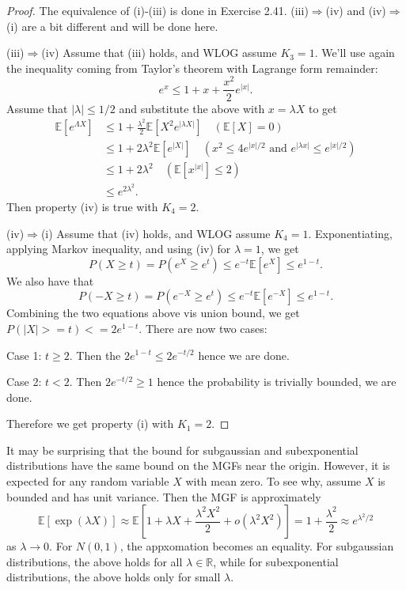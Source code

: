 \begin{proof}
The equivalence of (i)-(iii) is done in Exercise 2.41. (iii)$\Rightarrow$(iv) and (iv)$\Rightarrow$(i) 
are a bit different and will be done here.

(iii)$\Rightarrow$(iv) Assume that (iii) holds, and WLOG assume $K_3 = 1$. We'll use again the 
inequality coming from Taylor's theorem with Lagrange form remainder: 
\[ e^x \leq 1 + x + \frac{x^2}{2}e^{|x|}. \]
Assume that $|\lambda| \leq 1/2$ and substitute the above with $x = \lambda X$ to get 
\begin{align*}
	\mathbb{E}[e^{\Lambda X}] 
	&\leq 1 + \frac{\lambda^2}{2}\mathbb{E}[X^2 e^{|\lambda X|}] \quad (\mathbb{E}[X] = 0) \\
	&\leq 1 + 2 \lambda^2 \mathbb{E}[e^{|X|}] \quad (x^2 \leq 4e^{|x| / 2} \text{ and } 
	e^{|\lambda x|} \leq e^{|x| / 2}) \\
	&\leq 1 + 2 \lambda^2 \quad (\mathbb{E}[x^{|x|}] \leq 2) \\
	&\leq e^{2 \lambda^2}.
\end{align*}
Then property (iv) is true with $K_4 = 2$.

(iv)$\Rightarrow$(i) Assume that (iv) holds, and WLOG assume $K_4 = 1$. Exponentiating, applying Markov 
inequality, and using (iv) for $\lambda =1$, we get 
\[ P(X \geq t) = P(e^X \geq e^t) \leq e^{-t}\mathbb{E}[e^X] \leq e^{1 - t}. \]
We also have that 
\[ P(-X \geq t) = P(e^{-X} \geq e^t) \leq e^{-t}\mathbb{E}[e^{-X}] \leq e^{1 - t}. \]
Combining the two equations above vis union bound, we get $P(|X| >= t) <= 2e^{1 - t}$. There are now 
two cases: 

Case 1: $t \geq 2$. Then the $2e^{1 - t} \leq 2e^{-t / 2}$ hence we are done.

Case 2: $t < 2$. Then $2e^{-t / 2} \geq 1$ hence the probability is trivially bounded, we are done.

Therefore we get property (i) with $K_1 = 2$.
\end{proof}

\begin{remark}
\label{rmk:2.8.2}
It may be surprising that the bound for subgaussian and subexponential distributions have the same 
bound on the MGFs near the origin. However, it is expected for any random variable $X$ with mean zero. 
To see why, assume $X$ is bounded and has unit variance. Then the MGF is approximately 
\[ \mathbb{E}[\exp{(\lambda X)}] 
\approx \mathbb{E}\left[ 1 + \lambda X + \frac{\lambda^2 X^2}{2} + o(\lambda^2 X^2) \right] 
= 1 + \frac{\lambda^2}{2} \approx e^{\lambda^2 / 2} \]
as $\lambda \to 0$. For $N(0, 1)$, the appxomation becomes an equality. For subgaussian distributions, 
the above holds for all $\lambda \in \mathbb{R}$, while for subexponential distributions, the above 
holds only for small $\lambda$.
\end{remark}

